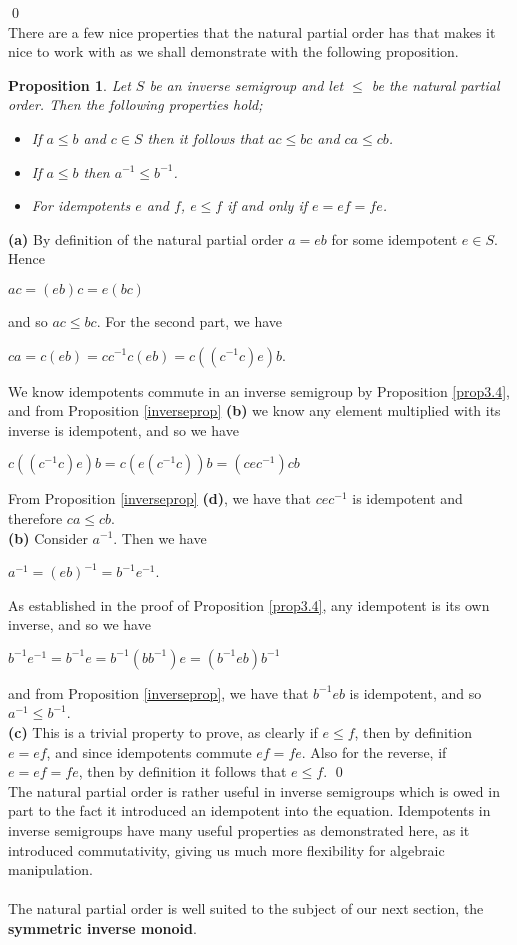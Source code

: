 \documentclass[12pt]{article}
\newtheorem{prop}[theorem]{Proposition}
\begin{document}
	\qed\\
There are a few nice properties that the natural partial order has that makes it nice to work with as we shall demonstrate with the following proposition.
\begin{prop}\label{natprop}
	Let $S$ be an inverse semigroup and let $\leq$ be the natural partial order. Then the following properties hold;
	\begin{itemize}
		\item[\textbf{(a)}] If $a \leq b$ and $c \in S$ then it follows that $ac \leq bc$ and $ca \leq cb$.
		\item[\textbf{(b)}] If $a \leq b$ then $a^{-1} \leq b^{-1}$.
		\item[\textbf{(c)}] For idempotents $e$ and $f$, $e \leq f$ if and only if $e = ef = fe$.
	\end{itemize}
\end{prop}
\proof
	\textbf{(a)} By definition of the natural partial order $a=eb$ for some idempotent $e \in S$. Hence
		\begin{center}
			$ac = (eb)c=e(bc)$
		\end{center}
		and so $ac \leq bc$. For the second part, we have
		\begin{center}
			$ca=c(eb)=cc^{-1}c(eb)=c((c^{-1}c)e)b$.
		\end{center}
		We know idempotents commute in an inverse semigroup by Proposition \ref{prop3.4}, and from Proposition \ref{inverseprop} \textbf{(b)} we know any element multiplied with its inverse is idempotent, and so we have
		\begin{center}
			$c((c^{-1}c)e)b = c(e(c^{-1}c))b=(cec^{-1})cb$
		\end{center}
		From Proposition \ref{inverseprop} \textbf{(d)}, we have that $cec^{-1}$ is idempotent and therefore $ca \leq cb$.\\
	\textbf{(b)} Consider $a^{-1}$. Then we have 
	\begin{center}
		$a^{-1}=(eb)^{-1}=b^{-1}e^{-1}$.
	\end{center}
	As established in the proof of Proposition \ref{prop3.4}, any idempotent is its own inverse, and so we have
	\begin{center}
		$b^{-1}e^{-1}=b^{-1}e=b^{-1}(bb^{-1})e=(b^{-1}eb)b^{-1}$
	\end{center}
	and from Proposition \ref{inverseprop}, we have that $b^{-1}eb$ is idempotent, and so $a^{-1} \leq b^{-1}$.\\
	\textbf{(c)} This is a trivial property to prove, as clearly if $e \leq f$, then by definition $e = ef$, and since idempotents commute $ef=fe$. Also for the reverse, if $e=ef=fe$, then by definition it follows that $e \leq f$.
	\qed\\
The natural partial order is rather useful in inverse semigroups which is owed in part to the fact it introduced an idempotent into the equation. Idempotents in inverse semigroups have many useful properties as demonstrated here, as it introduced commutativity, giving us much more flexibility for algebraic manipulation.\\ 
\\The natural partial order is well suited to the subject of our next section, the \textbf{symmetric inverse monoid}.
\end{document}
